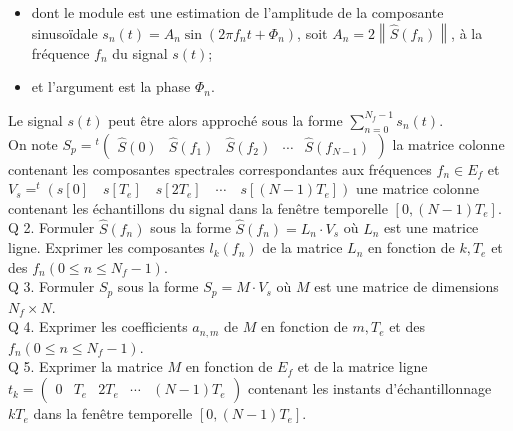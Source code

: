 \begin{itemize}
  \item dont le module est une estimation de l'amplitude de la composante sinusoïdale $s_{n}(t)=A_{n} \sin \left(2 \pi f_{n} t+\Phi_{n}\right)$, soit $A_{n}=2\left\|\hat{S}\left(f_{n}\right)\right\|$, à la fréquence $f_{n}$ du signal $s(t)$;
  \item et l'argument est la phase $\Phi_{n}$.
\end{itemize}

Le signal $s(t)$ peut être alors approché sous la forme $\sum_{n=0}^{N_{f}-1} s_{n}(t)$.\\
On note $S_{p}={ }^{t}\left(\begin{array}{lllll}\hat{S}(0) & \hat{S}\left(f_{1}\right) & \hat{S}\left(f_{2}\right) & \cdots & \hat{S}\left(f_{N-1}\right)\end{array}\right)$ la matrice colonne contenant les composantes spectrales correspondantes aux fréquences $f_{n} \in E_{f}$ et $V_{s}=^{t}\left(s[0] \quad s\left[T_{e}\right] \quad s\left[2 T_{e}\right] \quad \cdots \quad s\left[(N-1) T_{e}\right]\right)$ une matrice colonne contenant les échantillons du signal dans la fenêtre temporelle $\left[0,(N-1) T_{e}\right]$.\\
Q 2. Formuler $\hat{S}\left(f_{n}\right)$ sous la forme $\hat{S}\left(f_{n}\right)=L_{n} \cdot V_{s}$ où $L_{n}$ est une matrice ligne. Exprimer les composantes $l_{k}\left(f_{n}\right)$ de la matrice $L_{n}$ en fonction de $k, T_{e}$ et des $f_{n}\left(0 \leqslant n \leqslant N_{f}-1\right)$.\\
Q 3. Formuler $S_{p}$ sous la forme $S_{p}=M \cdot V_{s}$ où $M$ est une matrice de dimensions $N_{f} \times N$.\\
Q 4. Exprimer les coefficients $a_{n, m}$ de $M$ en fonction de $m, T_{e}$ et des $f_{n}\left(0 \leqslant n \leqslant N_{f}-1\right)$.\\
Q 5. Exprimer la matrice $M$ en fonction de $E_{f}$ et de la matrice ligne $t_{k}=\left(\begin{array}{lllll}0 & T_{e} & 2 T_{e} & \cdots & (N-1) T_{e}\end{array}\right)$ contenant les instants d'échantillonnage $k T_{e}$ dans la fenêtre temporelle $\left[0,(N-1) T_{e}\right]$.

